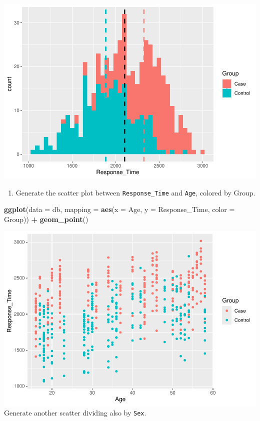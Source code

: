 \documentclass[
]{article}
\newenvironment{Shaded}{\begin{snugshade}}{\end{snugshade}}
\newcommand{\AttributeTok}[1]{\textcolor[rgb]{0.13,0.29,0.53}{#1}}
\newcommand{\FunctionTok}[1]{\textcolor[rgb]{0.13,0.29,0.53}{\textbf{#1}}}
\newcommand{\NormalTok}[1]{#1}
\newcommand{\SpecialCharTok}[1]{\textcolor[rgb]{0.81,0.36,0.00}{\textbf{#1}}}
\providecommand{\tightlist}{%
  \setlength{\itemsep}{0pt}\setlength{\parskip}{0pt}}
\begin{document}
\includegraphics{Simulated_example_files/figure-latex/unnamed-chunk-8-1.pdf}

\begin{enumerate}
\def\labelenumi{\alph{enumi}.}
\setcounter{enumi}{6}
\tightlist
\item
  Generate the scatter plot between \texttt{Response\_Time} and
  \texttt{Age}, colored by Group.
\end{enumerate}

\begin{Shaded}
\begin{Highlighting}[]
\FunctionTok{ggplot}\NormalTok{(}\AttributeTok{data =}\NormalTok{ db, }
       \AttributeTok{mapping =} \FunctionTok{aes}\NormalTok{(}\AttributeTok{x =}\NormalTok{ Age, }
                     \AttributeTok{y =}\NormalTok{ Response\_Time, }
                     \AttributeTok{color =}\NormalTok{ Group)) }\SpecialCharTok{+} 
  \FunctionTok{geom\_point}\NormalTok{()}
\end{Highlighting}
\end{Shaded}

\includegraphics{Simulated_example_files/figure-latex/unnamed-chunk-9-1.pdf}
Generate another scatter dividing also by \texttt{Sex}.
\end{document}
